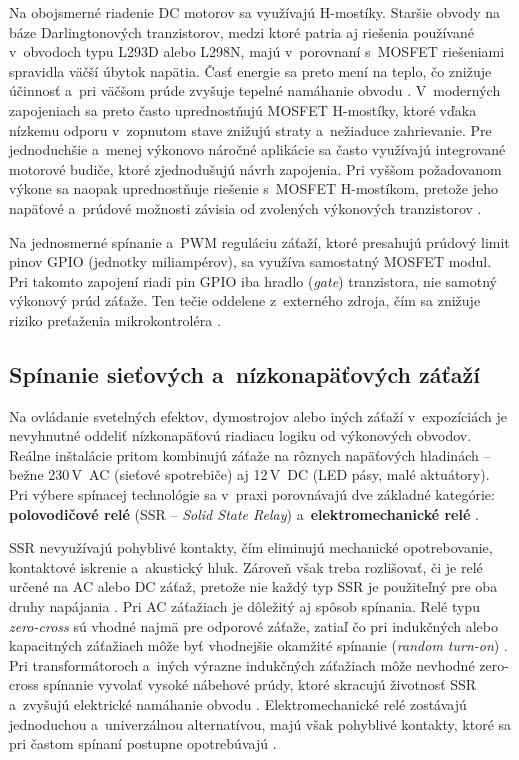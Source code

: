 Na obojsmerné riadenie DC motorov sa využívajú H-mostíky.
Staršie obvody na báze Darlingtonových tranzistorov, medzi
ktoré patria aj riešenia používané v~obvodoch typu L293D alebo
L298N, majú v~porovnaní s~MOSFET riešeniami spravidla väčší
úbytok napätia. Časť energie sa preto mení na teplo, čo znižuje
účinnosť a~pri väčšom prúde zvyšuje tepelné namáhanie obvodu
\cite{darlington_vs_mosfet}. V~moderných zapojeniach sa preto
často uprednostňujú MOSFET H-mostíky, ktoré vďaka nízkemu
odporu v~zopnutom stave znižujú straty a~nežiaduce zahrievanie.
Pre jednoduchšie a~menej výkonovo náročné aplikácie sa často
využívajú integrované motorové budiče, ktoré zjednodušujú
návrh zapojenia. Pri vyššom požadovanom výkone sa naopak
uprednostňuje riešenie s~MOSFET H-mostíkom, pretože jeho
napäťové a~prúdové možnosti závisia od zvolených výkonových
tranzistorov \cite{mosfet_h_bridge}.

Na jednosmerné spínanie a~PWM reguláciu záťaží, ktoré
presahujú prúdový limit pinov GPIO (jednotky miliampérov),
sa využíva samostatný MOSFET modul. Pri takomto zapojení
riadi pin GPIO iba hradlo (\textit{gate}) tranzistora, nie
samotný výkonový prúd záťaže. Ten tečie oddelene z~externého
zdroja, čím sa znižuje riziko preťaženia mikrokontroléra
\cite{darlington_vs_mosfet}.


\subsection{Spínanie sieťových a~nízkonapäťových záťaží}
\label{spinanie-sietoveho-napatia}

Na ovládanie svetelných efektov, dymostrojov alebo iných
záťaží v~expozíciách je nevyhnutné oddeliť nízkonapäťovú
riadiacu logiku od výkonových obvodov. Reálne inštalácie
pritom kombinujú záťaže na rôznych napäťových hladinách --
bežne 230\,V~AC (sieťové spotrebiče) aj 12\,V~DC (LED pásy,
malé aktuátory). Pri výbere spínacej technológie sa v~praxi
porovnávajú dve základné kategórie: \textbf{polovodičové
relé} (SSR -- \textit{Solid State Relay})
a~\textbf{elektromechanické relé} \cite{ssr_guide}.

SSR nevyužívajú pohyblivé kontakty, čím eliminujú mechanické
opotrebovanie, kontaktové iskrenie a~akustický hluk. Zároveň
však treba rozlišovať, či je relé určené na AC alebo DC záťaž,
pretože nie každý typ SSR je použiteľný pre oba druhy napájania
\cite{ssr_guide}. Pri AC záťažiach je dôležitý aj spôsob
spínania. Relé typu \textit{zero-cross} sú vhodné najmä pre
odporové záťaže, zatiaľ čo pri indukčných alebo kapacitných
záťažiach môže byť vhodnejšie okamžité spínanie
(\textit{random turn-on}) \cite{zero_cross_ssr}. Pri
transformátoroch a~iných výrazne indukčných záťažiach môže
nevhodné zero-cross spínanie vyvolať vysoké nábehové prúdy,
ktoré skracujú životnosť SSR a~zvyšujú elektrické namáhanie
obvodu \cite{ssr_zero_cross_transformers}. Elektromechanické
relé zostávajú jednoduchou a~univerzálnou alternatívou, majú
však pohyblivé kontakty, ktoré sa pri častom spínaní postupne
opotrebúvajú \cite{ssr_guide}.

